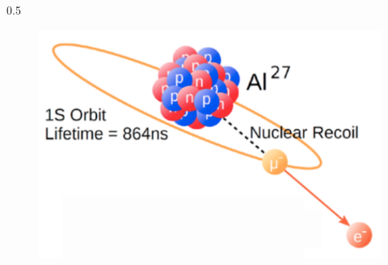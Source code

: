 \documentclass{beamer}
\begin{document}
\begin{frame}
\begin{columns}
\begin{column}{0.5\framewidth}
\begin{figure}[h]
        \end{figure} 
                \begin{figure}[h]
            \centering
            \includegraphics[width=0.75\columnwidth]{figures/png/Screenshot_20240913_160115.png}
        \end{figure} 
    \end{column}
\end{columns}
\end{frame}
\end{document}
